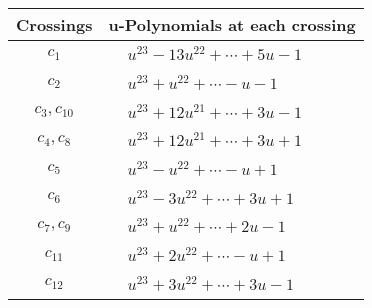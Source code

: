 \documentclass[1p]{elsarticle_modified}
\theoremstyle{definition}
\begin{document}
\begin{tabular}{m{50pt}|m{274pt}}
Crossings & \hspace{64pt}u-Polynomials at each crossing \\
\hline $$\begin{aligned}c_{1}\end{aligned}$$&$\begin{aligned}
&u^{23}-13 u^{22}+\cdots+5 u-1
\end{aligned}$\\
\hline $$\begin{aligned}c_{2}\end{aligned}$$&$\begin{aligned}
&u^{23}+u^{22}+\cdots- u-1
\end{aligned}$\\
\hline $$\begin{aligned}c_{3},c_{10}\end{aligned}$$&$\begin{aligned}
&u^{23}+12 u^{21}+\cdots+3 u-1
\end{aligned}$\\
\hline $$\begin{aligned}c_{4},c_{8}\end{aligned}$$&$\begin{aligned}
&u^{23}+12 u^{21}+\cdots+3 u+1
\end{aligned}$\\
\hline $$\begin{aligned}c_{5}\end{aligned}$$&$\begin{aligned}
&u^{23}- u^{22}+\cdots- u+1
\end{aligned}$\\
\hline $$\begin{aligned}c_{6}\end{aligned}$$&$\begin{aligned}
&u^{23}-3 u^{22}+\cdots+3 u+1
\end{aligned}$\\
\hline $$\begin{aligned}c_{7},c_{9}\end{aligned}$$&$\begin{aligned}
&u^{23}+u^{22}+\cdots+2 u-1
\end{aligned}$\\
\hline $$\begin{aligned}c_{11}\end{aligned}$$&$\begin{aligned}
&u^{23}+2 u^{22}+\cdots- u+1
\end{aligned}$\\
\hline $$\begin{aligned}c_{12}\end{aligned}$$&$\begin{aligned}
&u^{23}+3 u^{22}+\cdots+3 u-1
\end{aligned}$\\
\hline
\end{tabular}\\~\\
\end{document}
